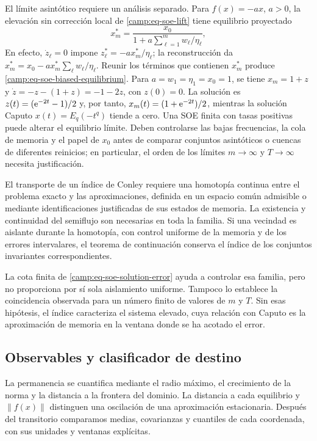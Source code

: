 El límite asintótico requiere un análisis separado. Para \(f(x)=-ax\),
\(a>0\), la elevación sin corrección local de \cref{camp:eq-soe-lift} tiene
equilibrio proyectado
\begin{equation}
 x_m^*=\frac{x_0}{1+a\sum_{\ell=1}^{m}w_\ell/\eta_\ell},
 \label{camp:eq-soe-biased-equilibrium}
\end{equation}
En efecto, \(\dot z_\ell=0\) impone
\(z_\ell^*=-ax_m^*/\eta_\ell\); la reconstrucción da
\(x_m^*=x_0-ax_m^*\sum_\ell w_\ell/\eta_\ell\). Reunir los términos que
contienen \(x_m^*\) produce \cref{camp:eq-soe-biased-equilibrium}.
Para \(a=w_1=\eta_1=x_0=1\), se tiene \(x_m=1+z\) y
\(\dot z=-z-(1+z)=-1-2z\), con \(z(0)=0\). La solución es
\(z(t)=(\mathrm e^{-2t}-1)/2\) y, por tanto,
\(x_m(t)=(1+\mathrm e^{-2t})/2\), mientras la solución
Caputo \(x(t)=E_q(-t^q)\) tiende a cero. Una SOE finita con tasas positivas
puede alterar el equilibrio límite. Deben controlarse las bajas frecuencias,
la cola de memoria y el papel de \(x_0\) antes de comparar conjuntos
asintóticos o cuencas de diferentes reinicios; en particular, el orden de los
límites \(m\to\infty\) y \(T\to\infty\) necesita justificación.

El transporte de un índice de Conley requiere una homotopía continua entre
el problema exacto y las aproximaciones, definida en un espacio común
admisible o mediante identificaciones justificadas de sus estados de memoria.
La existencia y continuidad del semiflujo son necesarias en toda la familia.
Si una vecindad es aislante durante la homotopía, con control uniforme de la
memoria y de los errores intervalares, el teorema de continuación conserva
el índice de los conjuntos invariantes correspondientes.

La cota finita de \cref{camp:eq-soe-solution-error} ayuda a controlar esa
familia, pero no proporciona por sí sola aislamiento uniforme. Tampoco lo
establece la coincidencia observada para un número finito de valores de
\(m\) y \(T\). Sin esas hipótesis, el índice caracteriza el sistema
elevado, cuya relación con Caputo es la aproximación de memoria en la ventana
donde se ha acotado el error.

\subsection{Observables y clasificador de destino}
\label{camp:observables}

La permanencia se cuantifica mediante el radio máximo, el crecimiento de
la norma y la distancia a la frontera del dominio. La distancia a cada
equilibrio y \(\|f(x)\|\) distinguen una oscilación de una aproximación
estacionaria. Después del transitorio comparamos medias, covarianzas y
cuantiles de cada coordenada, con sus unidades y ventanas explícitas.


